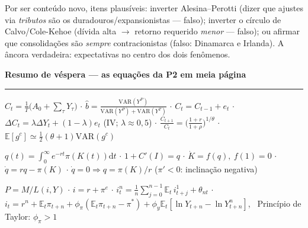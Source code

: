 \documentclass[12pt, a4paper]{article}
\newcommand{\E}{\mathbb{E}}
\newcommand{\dif}{\mathrm{d}}
\newcommand{\VAR}{\mathrm{VAR}}
\begin{document}
\begin{provabox}[title={Como cai na prova}]
Por ser conteúdo novo, itens plausíveis: inverter Alesina--Perotti (dizer que
ajustes via \emph{tributos} são os duradouros/expansionistas --- falso);
inverter o círculo de Calvo/Cole-Kehoe (dívida alta $\rightarrow$ retorno
requerido \emph{menor} --- falso); ou afirmar que consolidações são
\emph{sempre} contracionistas (falso: Dinamarca e Irlanda). A âncora
verdadeira: expectativas no centro dos dois fenômenos.
\end{provabox}

\newpage
\begin{center}
{\large\bfseries\color{orangerbc} Resumo de véspera --- as equações da P2 em meia página}\\[0.2em]
\rule{\linewidth}{0.6pt}
\end{center}

\begin{formulabox}[title={Consumo (cap.\ 8)}]
$C_t = \frac{1}{T}\bigl(A_0 + \sum_\tau Y_\tau\bigr)$
\quad$\cdot$\quad
$\hat b = \frac{\VAR(Y^P)}{\VAR(Y^P)+\VAR(Y^T)}$
\quad$\cdot$\quad
$C_t = C_{t-1} + e_t$
\quad$\cdot$\quad
$\Delta C_t = \lambda \Delta Y_t + (1-\lambda)e_t$ (IV; $\lambda\approx0{,}5$)
\quad$\cdot$\quad
$\frac{C_{t+1}}{C_t} = \bigl(\frac{1+r}{1+\rho}\bigr)^{1/\theta}$
\quad$\cdot$\quad
$\E[g^c] \simeq \frac{1}{2}(\theta+1)\VAR(g^c)$
\end{formulabox}

\begin{formulabox}[title={Investimento (cap.\ 9)}]
$q(t) = \int_0^\infty e^{-rt}\pi(K(t))\dif t$
\quad$\cdot$\quad
$1 + C'(I) = q$
\quad$\cdot$\quad
$\dot K = f(q),\ f(1)=0$
\quad$\cdot$\quad
$\dot q = rq - \pi(K)$
\quad$\cdot$\quad
$\dot q = 0 \Rightarrow q = \pi(K)/r$ ($\pi'<0$: inclinação negativa)
\end{formulabox}

\begin{formulabox}[title={Inflação e política monetária (cap.\ 11)}]
$P = M/L(i,Y)$
\quad$\cdot$\quad
$i = r + \pi^e$
\quad$\cdot$\quad
$i_t^n = \frac{1}{n}\sum_{j=0}^{n-1}\E_t\,i_{t+j}^1 + \theta_{nt}$
\quad$\cdot$\quad
$i_t = r^n + \E_t\pi_{t+n} + \phi_\pi(\E_t\pi_{t+n} - \pi^*) + \phi_y\E_t[\ln Y_{t+n} - \ln Y^n_{t+n}]$,
\ Princípio de Taylor: $\phi_\pi > 1$
\end{formulabox}
\end{document}

